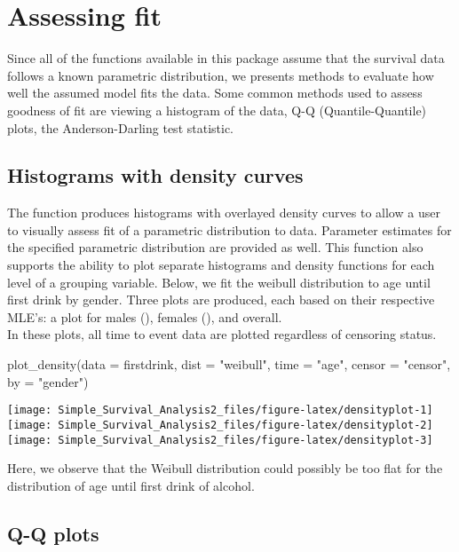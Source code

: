 \hypertarget{assessing-fit}{%
\section{Assessing fit}\label{assessing-fit}}

Since all of the functions available in this package assume that the
survival data follows a known parametric distribution, we presents
methods to evaluate how well the assumed model fits the data. Some
common methods used to assess goodness of fit are viewing a histogram of
the data, Q-Q (Quantile-Quantile) plots, the Anderson-Darling test
statistic.

\hypertarget{histograms-with-density-curves}{%
\subsection{Histograms with density
curves}\label{histograms-with-density-curves}}

The  function produces histograms with overlayed
density curves to allow a user to visually assess fit of a parametric
distribution to data. Parameter estimates for the specified parametric
distribution are provided as well. This function also supports the
ability to plot separate histograms and density functions for each level
of a grouping variable. Below, we fit the weibull distribution to age
until first drink by gender. Three plots are produced, each based on
their respective MLE's: a plot for males (), females
(), and overall.\\
In these plots, all time to event data are plotted regardless of
censoring status.

\begin{Schunk}
\begin{Sinput}
plot_density(data = firstdrink, dist = "weibull", time = "age", censor = "censor", by = "gender")
\end{Sinput}

\texttt{[image: Simple\_Survival\_Analysis2\_files/figure-latex/densityplot-1]} 
\texttt{[image: Simple\_Survival\_Analysis2\_files/figure-latex/densityplot-2]} 
\texttt{[image: Simple\_Survival\_Analysis2\_files/figure-latex/densityplot-3]} \end{Schunk}

Here, we observe that the Weibull distribution could possibly be too
flat for the distribution of age until first drink of alcohol.

\hypertarget{q-q-plots}{%
\subsection{Q-Q plots}\label{q-q-plots}}

